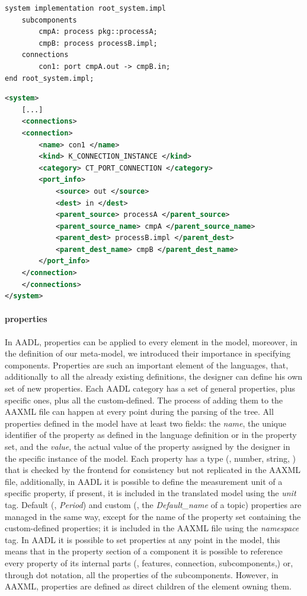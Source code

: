 \begin{lstlisting}[language=AADL,caption={Minimal AADL model containing connections.},label=lst:con-aadl]
system implementation root_system.impl
	subcomponents
		cmpA: process pkg::processA;
		cmpB: process processB.impl;
	connections
		con1: port cmpA.out -> cmpB.in;
end root_system.impl;
\end{lstlisting}

\begin{lstlisting}[language=XML,caption={AAXML description of AADL connections},label=lst:con-aaxml]
<system>
	[...]
	<connections>
	<connection>
		<name> con1 </name>
		<kind> K_CONNECTION_INSTANCE </kind>
		<category> CT_PORT_CONNECTION </category>
		<port_info>
			<source> out </source>
			<dest> in </dest>
			<parent_source> processA </parent_source>
			<parent_source_name> cmpA </parent_source_name>
			<parent_dest> processB.impl </parent_dest>
			<parent_dest_name> cmpB </parent_dest_name>
		</port_info>
	</connection>
	</connections>
</system>
\end{lstlisting}

\paragraph{properties} In AADL, properties can be applied to every element in the model, moreover, in the definition of our meta-model, we introduced their importance in specifying components. Properties are such an important element of the languages, that, additionally to all the already existing definitions, the designer can define his own set of new properties. Each AADL category has a set of general properties, plus specific ones, plus all the custom-defined. The process of adding them to the AAXML file can happen at every point during the parsing of the tree. All properties defined in the model have at least two fields: the \textit{name}, the unique identifier of the property as defined in the language definition or in the property set, and the \textit{value}, the actual value of the property assigned by the designer in the specific instance of the model. Each property has a type (\eg, number, string, \etc) that is checked by the frontend for consistency but not replicated in the AAXML file, additionally, in AADL it is possible to define the measurement unit of a specific property, if present, it is included in the translated model using the \textit{unit} tag. Default (\eg, \textit{Period}) and custom (\eg, the \textit{Default\_name} of a topic) properties are managed in the same way, except for the name of the property set containing the custom-defined properties; it is included in the AAXML file using the \textit{namespace} tag. In AADL it is possible to set properties at any point in the model, this means that in the property section of a component it is possible to reference every property of its internal parts (\eg, features, connection, subcomponents,\etc) or, through dot notation, all the properties of the subcomponents. However, in AAXML, properties are defined as direct children of the element owning them.

